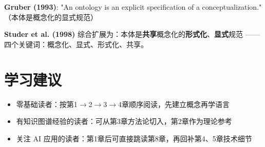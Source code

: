 \begin{noteblock}
\textbf{Gruber (1993)}: "An ontology is an explicit specification of a conceptualization."
（本体是概念化的显式规范）

\textbf{Studer et al. (1998)} 综合扩展为：本体是\textbf{共享}概念化的\textbf{形式化}、\textbf{显式}规范
—— 四个关键词：概念化、显式、形式化、共享。
\end{noteblock}

\section{学习建议}

\begin{itemize}
\item 零基础读者：按第1\(\rightarrow\)2\(\rightarrow\)3\(\rightarrow\)4章顺序阅读，先建立概念再学语言
\item 有知识图谱经验的读者：可从第3章方法论切入，第2章作为理论参考
\item 关注 AI 应用的读者：第1章后可直接跳读第8章，再回补第4、5章技术细节
\end{itemize}
